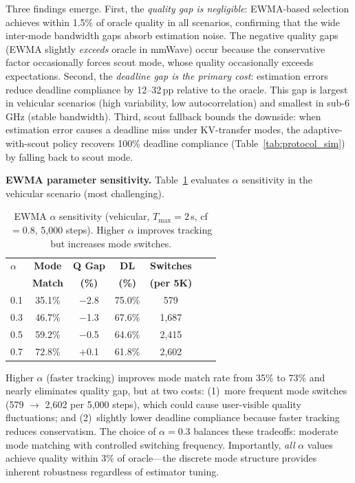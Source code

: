 \documentclass[journal]{IEEEtran}
\begin{document}
Three findings emerge.
First, the \emph{quality gap is negligible}: EWMA-based selection achieves within 1.5\% of oracle quality in all scenarios, confirming that the wide inter-mode bandwidth gaps absorb estimation noise.
The negative quality gaps (EWMA slightly \emph{exceeds} oracle in mmWave) occur because the conservative factor occasionally forces scout mode, whose quality occasionally exceeds expectations.
Second, the \emph{deadline gap is the primary cost}: estimation errors reduce deadline compliance by 12--32\,pp relative to the oracle.
This gap is largest in vehicular scenarios (high variability, low autocorrelation) and smallest in sub-6\,GHz (stable bandwidth).
Third, scout fallback bounds the downside: when estimation error causes a deadline miss under KV-transfer modes, the adaptive-with-scout policy recovers 100\% deadline compliance (Table~\ref{tab:protocol_sim}) by falling back to scout mode.

\textbf{EWMA parameter sensitivity.}
Table~\ref{tab:alpha_sensitivity} evaluates $\alpha$ sensitivity in the vehicular scenario (most challenging).

\begin{table}[t]
\centering
\caption{EWMA $\alpha$ sensitivity (vehicular, $T_{\max} = 2$\,s, cf$\!=\!0.8$, 5{,}000 steps). Higher $\alpha$ improves tracking but increases mode switches.}
\label{tab:alpha_sensitivity}
\footnotesize
\begin{tabular}{@{}lcccccc@{}}
\toprule
$\alpha$ & \textbf{Mode} & \textbf{Q Gap} & \textbf{DL} & \textbf{Switches} \\
         & \textbf{Match} & \textbf{(\%)} & \textbf{(\%)} & \textbf{(per 5K)} \\
\midrule
0.1 & 35.1\% & $-$2.8 & 75.0\% & 579  \\
0.3 & 46.7\% & $-$1.3 & 67.6\% & 1{,}687 \\
0.5 & 59.2\% & $-$0.5 & 64.6\% & 2{,}415 \\
0.7 & 72.8\% & $+$0.1 & 61.8\% & 2{,}602 \\
\bottomrule
\end{tabular}
\end{table}

Higher $\alpha$ (faster tracking) improves mode match rate from 35\% to 73\% and nearly eliminates quality gap, but at two costs: (1)~more frequent mode switches (579 $\to$ 2{,}602 per 5{,}000 steps), which could cause user-visible quality fluctuations; and (2)~slightly lower deadline compliance because faster tracking reduces conservatism.
The choice of $\alpha = 0.3$ balances these tradeoffs: moderate mode matching with controlled switching frequency.
Importantly, \emph{all} $\alpha$ values achieve quality within 3\% of oracle---the discrete mode structure provides inherent robustness regardless of estimator tuning.
\end{document}

